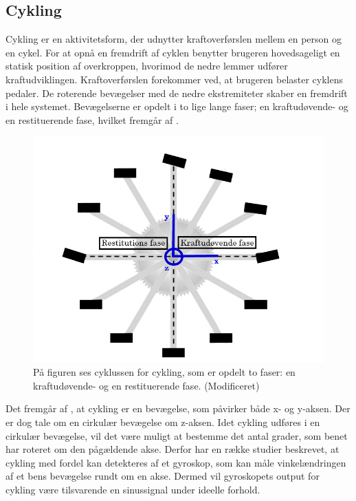 \subsection{Cykling}
Cykling er en aktivitetsform, der udnytter kraftoverførslen mellem en person og en cykel. For at opnå en fremdrift af cyklen benytter brugeren hovedsageligt en statisk position af overkroppen, hvorimod de nedre lemmer udfører kraftudviklingen. \citep{Springer2014} Kraftoverførslen forekommer ved, at brugeren belaster cyklens pedaler. De roterende bevægelser med de nedre ekstremiteter skaber en fremdrift i hele systemet. Bevægelserne er opdelt i to lige lange faser; en kraftudøvende- og en restituerende fase, hvilket fremgår af .
\begin{figure}[H]
	\centering
	\includegraphics[scale=0.45]{figures/bProblemloesning/cykel_cyklus.png}
	\caption{På figuren ses cyklussen for cykling, som er opdelt to faser: en kraftudøvende- og en restituerende fase. \citep{Springer2014} (Modificeret)}
	\label{fig:cykel_cyklus}
\end{figure}\vspace{-0.25cm}
Det fremgår af , at cykling er en bevægelse, som påvirker både x- og y-aksen. Der er dog tale om en cirkulær bevægelse om z-aksen. Idet cykling udføres i en cirkulær bevægelse, vil det være muligt at bestemme det antal grader, som benet har roteret om den pågældende akse. Derfor har en række studier beskrevet, at cykling med fordel kan detekteres af et gyroskop, som kan måle vinkelændringen af et bens bevægelse rundt om en akse. Dermed vil gyroskopets output for cykling være tilsvarende en sinussignal under ideelle forhold. \citep{Cockcroft2011,Marin-PerianuMarin-Perianu2013} 

